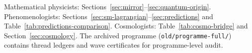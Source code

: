 \begin{remark}
Mathematical physicists: Sections~\ref{sec:mirror}--\ref{sec:quantum-origin}.
Phenomenologists: Sections~\ref{sec:sm-lagrangian}--\ref{sec:predictions} and
Table~\ref{tab:predictions-comparison}. Cosmologists:
Table~\ref{tab:cosmo-bridge} and Section~\ref{sec:cosmology}. The
archived programme (\texttt{old/programme-full/}) contains thread ledgers and
wave certificates for programme-level audit.
\end{remark}